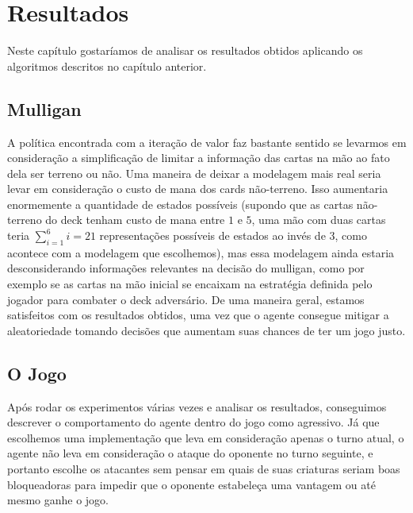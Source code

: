 \documentclass[dvipsnames]{book}
\begin{document}






\newpage


\chapter{Resultados}
Neste capítulo gostaríamos de analisar os resultados obtidos aplicando os algoritmos descritos no
capítulo anterior.

\section{Mulligan}
A política encontrada com a iteração de valor faz bastante sentido se levarmos em consideração a
simplificação de limitar a informação das cartas na mão ao fato dela ser terreno ou não. Uma
maneira de deixar a modelagem mais real seria levar em consideração o custo de mana dos cards
não-terreno. Isso aumentaria enormemente a quantidade de estados possíveis (supondo que as cartas
não-terreno do deck tenham custo de mana entre $1$ e $5$, uma mão com duas cartas teria
$\sum\limits_{i=1}^{6}i = 21$ representações possíveis de estados ao invés de $3$, como acontece
com a modelagem que escolhemos), mas essa modelagem ainda estaria desconsiderando informações
relevantes na decisão do mulligan, como por exemplo se as cartas na mão inicial se encaixam na
estratégia definida pelo jogador para combater o deck adversário. De uma maneira geral, estamos
satisfeitos com os resultados obtidos, uma vez que o agente consegue mitigar a aleatoriedade
tomando decisões que aumentam suas chances de ter um jogo justo.

\section{O Jogo}
Após rodar os experimentos várias vezes e analisar os resultados, conseguimos descrever o
comportamento do agente dentro do jogo como agressivo. Já que escolhemos uma implementação que
leva em consideração apenas o turno atual, o agente não leva em consideração o ataque do oponente
no turno seguinte, e portanto escolhe os atacantes sem pensar em quais de suas criaturas seriam
boas bloqueadoras para impedir que o oponente estabeleça uma vantagem ou até mesmo ganhe o jogo.
\end{document}
